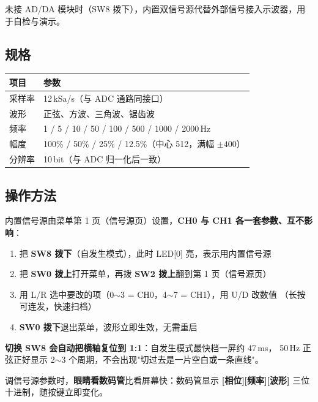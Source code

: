 \documentclass[UTF8,a4paper,11pt]{ctexart}
\begin{document}
未接 AD/DA 模块时（SW8 拨下），内置双信号源代替外部信号接入示波器，用于自检与演示。

\subsection{规格}

\begin{center}
\small
\begin{tabular}{ll}
\toprule
项目 & 参数\\
\midrule
采样率 & 12\,kSa/s（与 ADC 通路同接口）\\
波形 & 正弦、方波、三角波、锯齿波\\
频率 & 1 / 5 / 10 / 50 / 100 / 500 / 1000 / 2000\,Hz\\
幅度 & 100\% / 50\% / 25\% / 12.5\%（中心 512，满幅 $\pm400$）\\
分辨率 & 10\,bit（与 ADC 归一化后一致）\\
\bottomrule
\end{tabular}
\end{center}

\subsection{操作方法}

内置信号源由菜单第 1 页（信号源页）设置，\textbf{CH0 与 CH1 各一套参数、互不影响}：

\begin{enumerate}[leftmargin=2em]
  \item 把 \textbf{SW8 拨下}（自发生模式），此时 LED[0] 亮，表示用内置信号源
  \item 把 \textbf{SW0 拨上}打开菜单，再拨 \textbf{SW2 拨上}翻到第 1 页（信号源页）
  \item 用 L/R 选中要改的项（0$\sim$3 = CH0，4$\sim$7 = CH1），用 U/D 改数值
        （长按可连发，快速扫档）
  \item \textbf{SW0 拨下}退出菜单，波形立即生效，无需重启
\end{enumerate}

\begin{tipbox}
\textbf{切换 SW8 会自动把横轴复位到 1:1}：自发生模式最快档一屏约 47\,ms，
50\,Hz 正弦正好显示 2$\sim$3 个周期，不会出现"切过去是一片空白或一条直线"。
\end{tipbox}

\begin{tipbox}
调信号源参数时，\textbf{眼睛看数码管}比看屏幕快：数码管显示 \textbf{[相位][频率][波形]}
三位十进制，随按键立即变化。
\end{tipbox}
\end{document}
